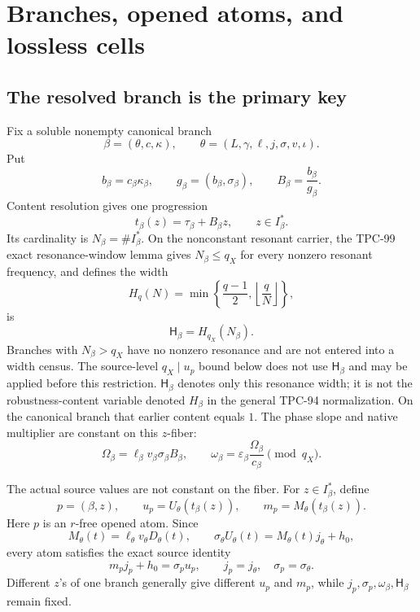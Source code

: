\section{Branches, opened atoms, and lossless cells}
\label{sec:literal-frame}

\subsection{The resolved branch is the primary key}

Fix a soluble nonempty canonical branch
\[
 \beta=(\theta,c,\kappa),\qquad
 \theta=(L,\gamma,\ell,j,\sigma,v,\iota).
\]
Put
\begin{equation}
 b_\beta=c_\beta\kappa_\beta,\qquad
 g_\beta=(b_\beta,\sigma_\beta),\qquad
 B_\beta=\frac{b_\beta}{g_\beta}.
\label{eq:branch-content}
\end{equation}
Content resolution gives one progression
\[
 t_\beta(z)=\tau_\beta+B_\beta z,
 \qquad z\in I_\beta^\ast.
\]
Its cardinality is \(N_\beta=\#I_\beta^\ast\).  On the
nonconstant resonant carrier, the TPC-99 exact resonance-window
lemma gives \(N_\beta\le q_X\) for every nonzero resonant
frequency, and defines the width
\[
 H_q(N)=
 \min\!\left\{\frac{q-1}{2},\left\lfloor\frac qN\right\rfloor\right\},
\]
is
\begin{equation}
 \mathsf H_\beta=H_{q_X}(N_\beta).
\label{eq:branch-width}
\end{equation}
Branches with \(N_\beta>q_X\) have no nonzero resonance and are not
entered into a width census.  The source-level
\(q_X\mid u_p\) bound below does not use \(\mathsf H_\beta\) and may be
applied before this restriction.
\(\mathsf H_\beta\) denotes only this resonance width; it is not the
robustness-content variable denoted \(H_\beta\) in the general
TPC-94 normalization.  On the canonical branch that earlier content
equals \(1\).
The phase slope and native multiplier are constant on this
\(z\)-fiber:
\begin{equation}
 \Omega_\beta
 =
 \ell_\beta v_\beta\sigma_\beta B_\beta,
\qquad
 \omega_\beta
 =
 \varepsilon_\beta\frac{\Omega_\beta}{c_\beta}
 \pmod{q_X}.
\label{eq:branch-multiplier}
\end{equation}

The actual source values are not constant on the fiber.  For
\(z\in I_\beta^\ast\), define
\begin{equation}
 p=(\beta,z),\qquad
 u_p=U_\theta(t_\beta(z)),\qquad
 m_p=M_\theta(t_\beta(z)).
\label{eq:opened-atom-values}
\end{equation}
Here \(p\) is an \(r\)-free opened atom.  Since
\[
 M_\theta(t)=\ell_\theta v_\theta D_\theta(t),
\qquad
 \sigma_\theta U_\theta(t)
 =
 M_\theta(t)j_\theta+h_0,
\]
every atom satisfies the exact source identity
\begin{equation}
 m_pj_p+h_0=\sigma_pu_p,
\qquad
 j_p=j_\theta,\quad\sigma_p=\sigma_\theta.
\label{eq:atom-source-identity}
\end{equation}
Different \(z\)'s of one branch generally give different \(u_p\)
and \(m_p\), while \(j_p,\sigma_p,\omega_\beta,\mathsf H_\beta\) remain
fixed.

